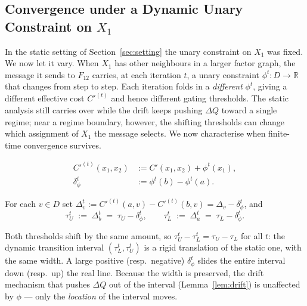 \subsection{Convergence under a Dynamic Unary Constraint on $X_1$}\label{sec:dynamic}
In the static setting of Section~\ref{sec:setting} the unary constraint on $X_1$ was fixed.  We now let it vary.  When $X_1$ has other neighbours in a larger factor graph, the message it sends to $F_{12}$ carries, at each iteration $t$, a unary constraint $\phi^t : D \to \mathbb{R}$ that changes from step to step.
Each iteration folds in a \emph{different} $\phi^t$, giving a different effective cost $C'^{(t)}$ and hence different gating thresholds.  The static analysis still carries over while the drift keeps pushing $\Delta Q$ toward a single regime; near a regime boundary, however, the shifting thresholds can change which assignment of $X_1$ the message selects.  We now characterise when finite-time convergence survives.
\begin{definition}\label{def:dynC}
\[
    \begin{aligned}
        C'^{(t)}(x_1, x_2) &:= C'(x_1, x_2) + \phi^t(x_1), \\
        \delta^t_\phi &:= \phi^t(b) - \phi^t(a).
    \end{aligned}
\]
\end{definition}
\begin{definition}\label{def:dynthresh}
For each $v \in D$ set $\Delta^t_v := C'^{(t)}(a,v) - C'^{(t)}(b,v) = \Delta_v - \delta^t_\phi$, and
\[
    \tau_U^t \;:=\; \Delta^t_b \;=\; \tau_U - \delta^t_\phi,
    \qquad
    \tau_L^t \;:=\; \Delta^t_a \;=\; \tau_L - \delta^t_\phi.
\]
\end{definition}
\noindent Both thresholds shift by the same amount, so $\tau_U^t - \tau_L^t = \tau_U - \tau_L$ for all $t$: the dynamic transition interval $(\tau_L^t, \tau_U^t)$ is a rigid translation of the static one, with the same width.  A large positive (resp.\ negative) $\delta^t_\phi$ slides the entire interval down (resp.\ up) the real line.  Because the width is preserved, the drift mechanism that pushes $\Delta Q$ out of the interval (Lemma~\ref{lem:drift}) is unaffected by $\phi$ --- only the \emph{location} of the interval moves.
